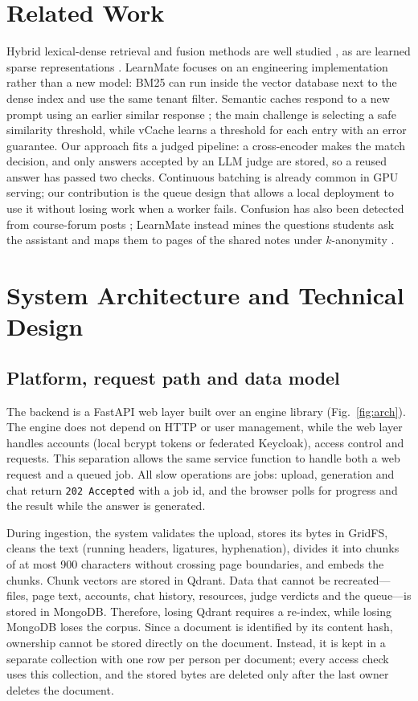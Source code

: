 \documentclass[conference]{IEEEtran}
\newcommand{\sys}{LearnMate}
\begin{document}
\section{Related Work}

Hybrid lexical-dense retrieval and fusion methods are well studied \cite{cormack2009rrf}, as are
learned sparse representations \cite{formal2021splade}. \sys{} focuses on an engineering
implementation rather than a new model: BM25 can run inside the vector database next to the dense
index and use the same tenant filter. Semantic caches respond to a new prompt using an earlier
similar response \cite{bang2023gptcache}; the main challenge is selecting a safe similarity
threshold, while vCache \cite{schroeder2025vcache} learns a threshold for each entry with an error
guarantee. Our approach fits a judged pipeline: a cross-encoder makes the match decision, and only
answers accepted by an LLM judge \cite{zheng2023judge} are stored, so a reused answer has passed two
checks. Continuous batching \cite{yu2022orca} is already common in GPU serving; our contribution
is the queue design that allows a local deployment to use it without losing work when a worker fails.
Confusion has also been detected from course-forum posts \cite{yang2015confusion}; \sys{} instead
mines the questions students ask the assistant and maps them to pages of the shared notes under
$k$-anonymity \cite{sweeney2002kanon}.

\section{System Architecture and Technical Design}

\subsection{Platform, request path and data model}

The backend is a FastAPI web layer built over an engine library (Fig.~\ref{fig:arch}). The engine
does not depend on HTTP or user management, while the web layer handles accounts (local bcrypt tokens
or federated Keycloak), access control and requests. This separation allows the same service function
to handle both a web request and a queued job. All slow operations are jobs: upload, generation and
chat return \texttt{202 Accepted} with a job id, and the browser polls for progress and the result
while the answer is generated.

During ingestion, the system validates the upload, stores its bytes in GridFS, cleans the text
(running headers, ligatures, hyphenation), divides it into chunks of at most 900 characters without
crossing page boundaries, and embeds the chunks. Chunk vectors are stored in Qdrant. Data that cannot
be recreated---files, page text, accounts, chat history, resources, judge verdicts and the queue---is
stored in MongoDB. Therefore, losing Qdrant requires a re-index, while losing MongoDB loses the
corpus. Since a document is identified by its content hash, ownership cannot be stored directly on
the document. Instead, it is kept in a separate collection with one row per person per document;
every access check uses this collection, and the stored bytes are deleted only after the last owner
deletes the document.
\end{document}
